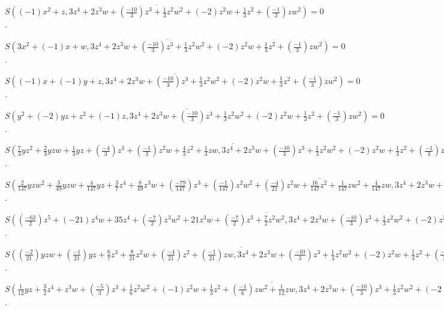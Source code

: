 $\overline{S((-1)x^{2}+z, 3z^{4}+2z^{3}w+(\frac{-10}{3})z^{3}+\frac{1}{3}z^{2}w^{2}+(-2)z^{2}w+\frac{1}{3}z^{2}+(\frac{-1}{3})zw^{2})} = 0$.

$\overline{S(3x^{2}+(-1)x+w, 3z^{4}+2z^{3}w+(\frac{-10}{3})z^{3}+\frac{1}{3}z^{2}w^{2}+(-2)z^{2}w+\frac{1}{3}z^{2}+(\frac{-1}{3})zw^{2})} = 0$.

$\overline{S((-1)x+(-1)y+z, 3z^{4}+2z^{3}w+(\frac{-10}{3})z^{3}+\frac{1}{3}z^{2}w^{2}+(-2)z^{2}w+\frac{1}{3}z^{2}+(\frac{-1}{3})zw^{2})} = 0$.

$\overline{S(y^{2}+(-2)yz+z^{2}+(-1)z, 3z^{4}+2z^{3}w+(\frac{-10}{3})z^{3}+\frac{1}{3}z^{2}w^{2}+(-2)z^{2}w+\frac{1}{3}z^{2}+(\frac{-1}{3})zw^{2})} = 0$.

$\overline{S(\frac{7}{3}yz^{2}+\frac{2}{3}yzw+\frac{1}{3}yz+(\frac{-4}{3})z^{3}+(\frac{-1}{3})z^{2}w+\frac{4}{3}z^{2}+\frac{1}{3}zw, 3z^{4}+2z^{3}w+(\frac{-10}{3})z^{3}+\frac{1}{3}z^{2}w^{2}+(-2)z^{2}w+\frac{1}{3}z^{2}+(\frac{-1}{3})zw^{2})} = 0$.

$\overline{S(\frac{2}{147}yzw^{2}+\frac{3}{49}yzw+\frac{4}{147}yz+\frac{3}{7}z^{4}+\frac{8}{49}z^{3}w+(\frac{-79}{147})z^{3}+(\frac{-1}{147})z^{2}w^{2}+(\frac{-4}{21})z^{2}w+\frac{16}{147}z^{2}+\frac{1}{147}zw^{2}+\frac{4}{147}zw, 3z^{4}+2z^{3}w+(\frac{-10}{3})z^{3}+\frac{1}{3}z^{2}w^{2}+(-2)z^{2}w+\frac{1}{3}z^{2}+(\frac{-1}{3})zw^{2})} = 0$.

$\overline{S((\frac{-63}{2})z^{5}+(-21)z^{4}w+35z^{4}+(\frac{-7}{2})z^{3}w^{2}+21z^{3}w+(\frac{-7}{2})z^{3}+\frac{7}{2}z^{2}w^{2}, 3z^{4}+2z^{3}w+(\frac{-10}{3})z^{3}+\frac{1}{3}z^{2}w^{2}+(-2)z^{2}w+\frac{1}{3}z^{2}+(\frac{-1}{3})zw^{2})} = 0$.

$\overline{S((\frac{-2}{21})yzw+(\frac{-1}{21})yz+\frac{6}{7}z^{3}+\frac{8}{21}z^{2}w+(\frac{-4}{21})z^{2}+(\frac{-1}{21})zw, 3z^{4}+2z^{3}w+(\frac{-10}{3})z^{3}+\frac{1}{3}z^{2}w^{2}+(-2)z^{2}w+\frac{1}{3}z^{2}+(\frac{-1}{3})zw^{2})} = 0$.

$\overline{S(\frac{1}{12}yz+\frac{3}{2}z^{4}+z^{3}w+(\frac{-5}{3})z^{3}+\frac{1}{6}z^{2}w^{2}+(-1)z^{2}w+\frac{1}{3}z^{2}+(\frac{-1}{6})zw^{2}+\frac{1}{12}zw, 3z^{4}+2z^{3}w+(\frac{-10}{3})z^{3}+\frac{1}{3}z^{2}w^{2}+(-2)z^{2}w+\frac{1}{3}z^{2}+(\frac{-1}{3})zw^{2})} = 0$.

